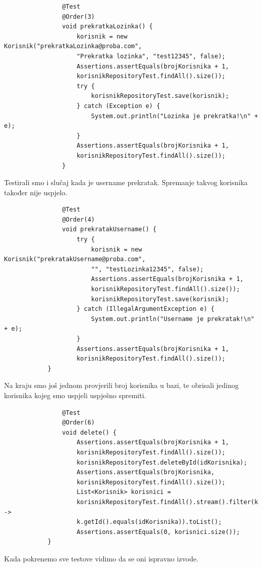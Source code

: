 			\begin{verbatim}
			    @Test
			    @Order(3)
		        void prekratkaLozinka() {
			        korisnik = new Korisnik("prekratkaLozinka@proba.com",
			        "Prekratka lozinka", "test12345", false);
			        Assertions.assertEquals(brojKorisnika + 1,
			        korisnikRepositoryTest.findAll().size());
			        try {
				        korisnikRepositoryTest.save(korisnik);
			        } catch (Exception e) {
				        System.out.println("Lozinka je prekratka!\n" + e);
			        }
			        Assertions.assertEquals(brojKorisnika + 1, 
			        korisnikRepositoryTest.findAll().size());
			    } 
			\end{verbatim}
			Testirali smo i slučaj kada je username prekratak. Spremanje takvog korisnika također nije uspjelo.
			
			\begin{verbatim}
			    @Test
			    @Order(4)
			    void prekratakUsername() {
			        try {
			            korisnik = new Korisnik("prekratakUsername@proba.com", 
			            "", "testLozinka12345", false);
			            Assertions.assertEquals(brojKorisnika + 1, 
			            korisnikRepositoryTest.findAll().size());
			            korisnikRepositoryTest.save(korisnik);
			        } catch (IllegalArgumentException e) {
			            System.out.println("Username je prekratak!\n" + e);
			        }
			        Assertions.assertEquals(brojKorisnika + 1,
			        korisnikRepositoryTest.findAll().size());
		    }
			\end{verbatim}
			Na kraju smo još jednom provjerili broj korisnika u bazi, te obrisali jedinog korisnika kojeg smo uspjeli uspješno spremiti.
			
			\begin{verbatim}
			    @Test
			    @Order(6)
			    void delete() {
			        Assertions.assertEquals(brojKorisnika + 1, 
			        korisnikRepositoryTest.findAll().size());
			        korisnikRepositoryTest.deleteById(idKorisnika);
			        Assertions.assertEquals(brojKorisnika, 
			        korisnikRepositoryTest.findAll().size());
			        List<Korisnik> korisnici = 
			        korisnikRepositoryTest.findAll().stream().filter(k ->
			        k.getId().equals(idKorisnika)).toList();
                    Assertions.assertEquals(0, korisnici.size());
		    }
			\end{verbatim}
			Kada pokrenemo sve testove vidimo da se oni ispravno izvode.
			
